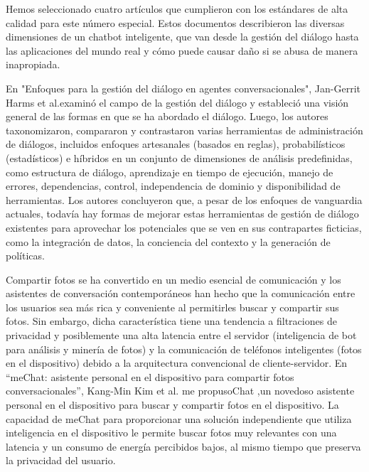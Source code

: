 Hemos seleccionado cuatro artículos que cumplieron con los estándares de alta calidad para este número especial. Estos documentos describieron las diversas dimensiones de un chatbot inteligente, que van desde la gestión del diálogo hasta las aplicaciones del mundo real y cómo puede causar daño si se abusa de manera inapropiada.

En "Enfoques para la gestión del diálogo en agentes conversacionales", Jan-Gerrit Harms et al.examinó el campo de la gestión del diálogo y estableció una visión general de las formas en que se ha abordado el diálogo. Luego, los autores taxonomizaron, compararon y contrastaron varias herramientas de administración de diálogos, incluidos enfoques artesanales (basados en reglas), probabilísticos (estadísticos) e híbridos en un conjunto de dimensiones de análisis predefinidas, como estructura de diálogo, aprendizaje en tiempo de ejecución, manejo de errores, dependencias, control, independencia de dominio y disponibilidad de herramientas. Los autores concluyeron que, a pesar de los enfoques de vanguardia actuales, todavía hay formas de mejorar estas herramientas de gestión de diálogo existentes para aprovechar los potenciales que se ven en sus contrapartes ficticias, como la integración de datos, la conciencia del contexto y la generación de políticas.

Compartir fotos se ha convertido en un medio esencial de comunicación y los asistentes de conversación contemporáneos han hecho que la comunicación entre los usuarios sea más rica y conveniente al permitirles buscar y compartir sus fotos. Sin embargo, dicha característica tiene una tendencia a filtraciones de privacidad y posiblemente una alta latencia entre el servidor (inteligencia de bot para análisis y minería de fotos) y la comunicación de teléfonos inteligentes (fotos en el dispositivo) debido a la arquitectura convencional de cliente-servidor. En “meChat: asistente personal en el dispositivo para compartir fotos conversacionales”, Kang-Min Kim et al. me propusoChat ,un novedoso asistente personal en el dispositivo para buscar y compartir fotos en el dispositivo. La capacidad de meChat para proporcionar una solución independiente que utiliza inteligencia en el dispositivo le permite buscar fotos muy relevantes con una latencia y un consumo de energía percibidos bajos, al mismo tiempo que preserva la privacidad del usuario.

